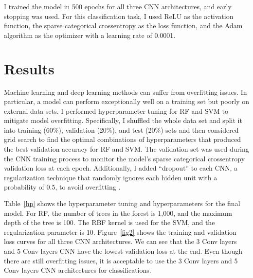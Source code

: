 \documentclass[letterpaper]{article} %
\begin{document}
I trained the model in 500 epochs for all three CNN architectures, and early stopping was used. For this classification task, I used ReLU as the activation function, the sparse categorical crossentropy as the loss function, and the Adam algorithm as the optimizer with a learning rate of 0.0001. 


\begin{table}[t]
\centering
{}
\caption{Hyperparameters tuning for random forest and support vector machine and hyperparameters for the final models}
\label{hp}
\end{table}

\section{Results}

Machine learning and deep learning methods can suffer from overfitting issues. In particular, a model can perform exceptionally well on a training set but poorly on external data sets. I performed hyperparameter tuning for RF and SVM to mitigate model overfitting. Specifically, I shuffled the whole data set and split it into training (60\%), validation (20\%), and test (20\%) sets and then considered grid search to find the optimal combinations of hyperparameters that produced the best validation accuracy for RF and SVM. The validation set was used during the CNN training process to monitor the model's sparse categorical crossentropy validation loss at each epoch. Additionally, I added ``dropout'' to each CNN, a regularization technique that randomly ignores each hidden unit with a probability of 0.5, to avoid overfitting \cite{hinton2012improving}. 

Table~\ref{hp} shows the hyperparameter tuning and hyperparameters for the final model. For RF, the number of trees in the forest is 1,000, and the maximum depth of the tree is 100. The RBF kernel is used for the SVM, and the regularization parameter is 10. Figure~\ref{fig2} shows the training and validation loss curves for all three CNN architectures. We can see that the 3 Conv layers and 5 Conv layers CNN have the lowest validation loss at the end. Even though there are still overfitting issues, it is acceptable to use the 3 Conv layers and 5 Conv layers CNN architectures for classifications.
\end{document}
